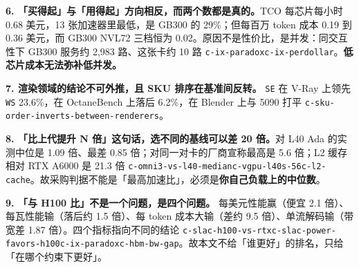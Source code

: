 \textbf{6. 「买得起」与「用得起」方向相反，而两个数都是真的。}TCO 每芯片每小时 0.68 美元，13 张加速器里最低，是 GB300 的 29\%；但每百万 token 成本 0.19 到 0.36 美元，而 GB300 NVL72 三档恒为 0.02。原因不是性价比，是并发：同交互性下 GB300 服务约 2,983 路、这张卡约 10 路 {\scriptsize\texttt{c-\hspace{0pt}ix-\hspace{0pt}paradox}}{\scriptsize\texttt{c-\hspace{0pt}ix-\hspace{0pt}perdollar}}。\textbf{低芯片成本无法弥补低并发。}


\textbf{7. 渲染领域的结论不可外推，且 SKU 排序在基准间反转。} \texttt{SE} 在 V-Ray 上领先 \texttt{WS} 23.6\%，在 OctaneBench 上落后 6.2\%，在 Blender 上与 5090 打平 {\scriptsize\texttt{c-\hspace{0pt}sku-\hspace{0pt}order-\hspace{0pt}inverts-\hspace{0pt}between-\hspace{0pt}renderers}}。


\textbf{8. 「比上代提升 N 倍」这句话，选不同的基线可以差 20 倍。}对 L40 Ada 的实测中位是 1.09 倍、最差 0.85 倍；对同一对卡的厂商宣称最高是 5.6 倍；L2 缓存相对 RTX A6000 是 21.3 倍 {\scriptsize\texttt{c-\hspace{0pt}omni3-\hspace{0pt}vs-\hspace{0pt}l40-\hspace{0pt}median}}{\scriptsize\texttt{c-\hspace{0pt}vgpu-\hspace{0pt}l40s-\hspace{0pt}56}}{\scriptsize\texttt{c-\hspace{0pt}l2-\hspace{0pt}cache}}。故采购判据不能是「最高加速比」，必须是\textbf{你自己负载上的中位数}。


\textbf{9. 「与 H100 比」不是一个问题，是四个问题。} 每美元性能赢（便宜 2.1 倍）、每瓦性能输（落后约 1.5 倍）、每 token 成本大输（差约 9.5 倍）、单流解码输（带宽差 1.87 倍）。四个指标指向不同的结论 {\scriptsize\texttt{c-\hspace{0pt}slac-\hspace{0pt}h100-\hspace{0pt}vs-\hspace{0pt}rtx}}{\scriptsize\texttt{c-\hspace{0pt}slac-\hspace{0pt}power-\hspace{0pt}favors-\hspace{0pt}h100}}{\scriptsize\texttt{c-\hspace{0pt}ix-\hspace{0pt}paradox}}{\scriptsize\texttt{c-\hspace{0pt}hbm-\hspace{0pt}bw-\hspace{0pt}gap}}。故本文不给「谁更好」的排名，只给「在哪个约束下更好」。


